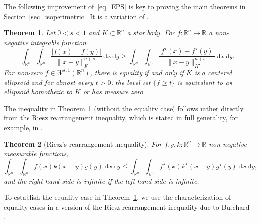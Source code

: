 \documentclass{amsart}
\newtheorem{theorem}{Theorem}
\newcommand{\dvtex}{\,\mathrm{d}}
\begin{document}
\goodbreak
The following improvement of~\eqref{eq_EPS} is key to proving the main
theorems in Section~\ref{sec_isoperimetric}. It is a variation of
\cite[Theorem 3.1]{andreas}.

\begin{theorem}%
\label{thm_fburchard}
Let $0<s<1$ and $K\subset \mathbb R^{n}$ a star body. For
$f :\mathbb R^{n} \to \mathbb R$ a non-negative integrable function,
%
\begin{equation}
\int _{\mathbb R^{n}} \int _{\mathbb R^{n}}
\frac{|f(x) - f(y)|}{\|x-y\|^{n+s}_{K}} \dvtex x \dvtex y \geq \int _{
\mathbb R^{n}} \int _{\mathbb R^{n}}
\frac{|f^{\star}(x) - f^{\star}(y)|}{\|x-y\|^{n+s}_{K^{\star}}} \dvtex x
\dvtex y.
\nonumber \end{equation}
%
For non-zero $f\in W^{s,1}(\mathbb R^{n})$, there is equality if and only
if $K$ is a centered ellipsoid and for almost every $t>0$, the level set
$\{f \geq t\}$ is equivalent to an ellipsoid homothetic to $K$ or has measure
zero.
\end{theorem}

\noindent
The inequality in Theorem~\ref{thm_fburchard} (without the equality case)
follows rather directly from the Riesz rearrangement inequality, which
is stated in full generality, for example, in \cite{BLL}.

\begin{theorem}[Riesz's rearrangement inequality]
\label{thm_BLL}
For $f,g,k:\mathbb R^{n} \to \mathbb R$ non-negative measurable functions,
%
\begin{equation*}
\int _{\mathbb R^{n}}\int _{\mathbb R^{n}} f(x) k(x-y) g(y) \dvtex x \dvtex y
\leq \int _{\mathbb R^{n}}\int _{\mathbb R^{n}} f^{\star}(x) k^{\star}(x-y)
g^{\star}(y) \dvtex x \dvtex y,
\end{equation*}
%
and the right-hand side is infinite if the left-hand side is infinite.
\end{theorem}

To establish the equality case in Theorem~\ref{thm_fburchard}, we use the
characterization of equality cases in a version of the Riesz rearrangement
inequality due to Burchard \cite{Burchard96}.
\end{document}

